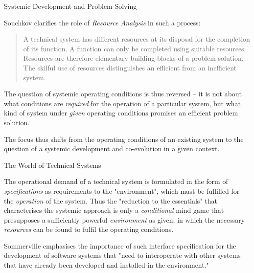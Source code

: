 \documentclass{beamer}
\begin{document}
\begin{frame}{Systemic Development and Problem Solving}
  
Souchkov clarifies the role of \emph{Resource Analysis} in such a process:
\begin{quote}\small
  A technical system has different resources at its disposal for the
  completion of its function. A function can only be completed using suitable
  resources. Resources are therefore elementary building blocks of a problem
  solution. The skilful use of resources distinguishes an efficient from an
  inefficient system.
\end{quote}

The question of systemic operating conditions is thus reversed -- it is not
about what conditions are \emph{required} for the operation of a particular
system, but what kind of system under \emph{given} operating conditions
promises an efficient problem solution.

The focus thus shifts from the operating conditions of an existing system to
the question of a systemic development and co-evolution in a given context.

\end{frame}

\begin{frame}{The World of Technical Systems}

The operational demand of a technical system is formulated in the form of
\emph{specifications} as requirements to the "environment", which must be
fulfilled for the \emph{operation} of the system. Thus the "reduction to the
essentials" that characterises the systemic approach is only a
\emph{conditional} mind game that presupposes a sufficiently powerful
\emph{environment} as given, in which the necessary \emph{resources} can be
found to fulfil the operating conditions.

Sommerville emphasises the importance of such interface specification for the
development of software systems that "need to interoperate with other systems
that have already been developed and installed in the environment."

\end{frame}
\end{document}
